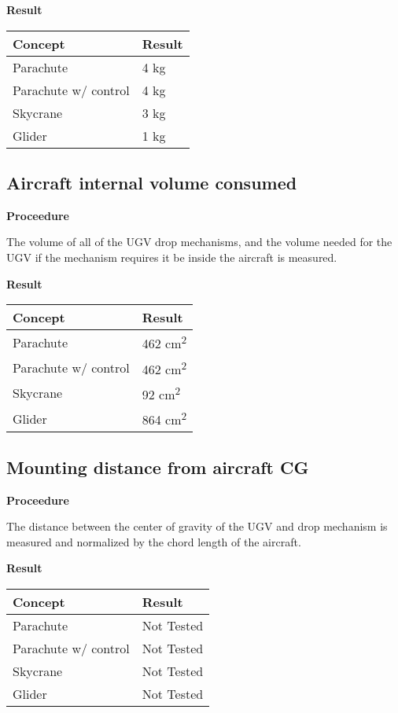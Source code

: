 \documentclass[]{auvsi_doc}
\begin{document}
	\textbf{Result}


	\begin{tabular}{|l|l|}
		\hline
		\textbf{Concept}       & \textbf{Result} \\
		\hline
		Parachute              &         4 kg        \\
		Parachute w/ control   &          4 kg       \\
		Skycrane               &        3 kg         \\
		Glider                 & 		1 kg	 \\
		\hline
	\end{tabular}

	\subsection{Aircraft internal volume consumed}
	\textbf{Proceedure}

	The volume of all of the UGV drop mechanisms, and the volume needed for the UGV if the mechanism requires it be inside the aircraft is measured.

	\textbf{Result}


	\begin{tabular}{|l|l|}
		\hline
		\textbf{Concept}       & \textbf{Result} \\
		\hline
		Parachute              &        462 cm\textsuperscript{2}         \\
		Parachute w/ control   &    462 cm\textsuperscript{2}             \\
		Skycrane               &          92 cm\textsuperscript{2}       \\
		Glider                 & 		864 cm\textsuperscript{2}	 \\
		\hline
	\end{tabular}

	\subsection{Mounting distance from aircraft CG}
	\textbf{Proceedure}

	The distance between the center of gravity of the UGV and drop mechanism is measured and normalized by the chord length of the aircraft.

	\textbf{Result}


	\begin{tabular}{|l|l|}
		\hline
		\textbf{Concept}       & \textbf{Result} \\
		\hline
		Parachute              &      Not Tested           \\
		Parachute w/ control   &           Not Tested      \\
		Skycrane               &     Not Tested            \\
		Glider                 &		Not Tested		 \\
		\hline
	\end{tabular}
\end{document}
